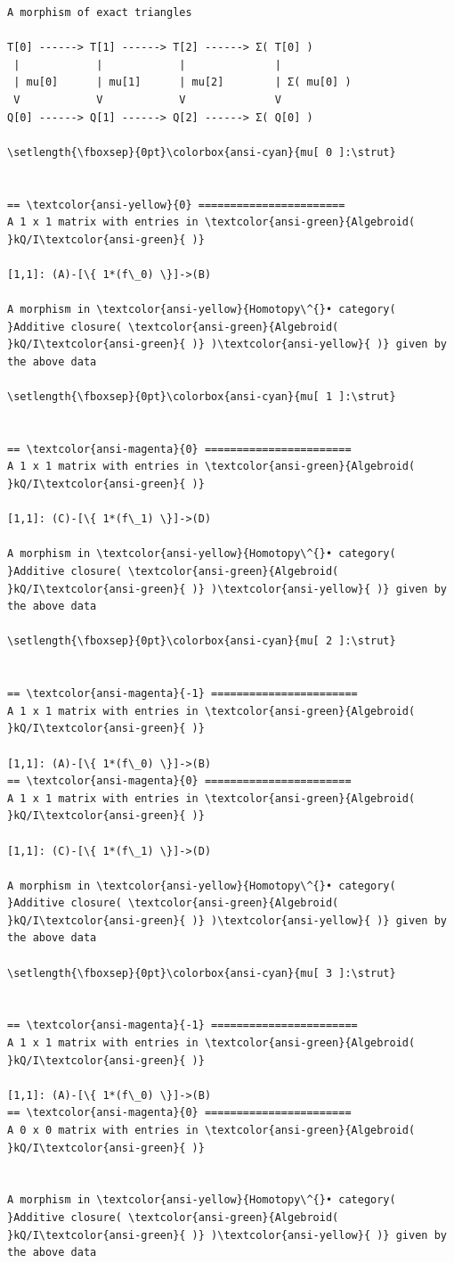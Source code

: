 \documentclass[11pt]{article}
\begin{document}
    \begin{Verbatim}[commandchars=\\\{\}]
A morphism of exact triangles

T[0] ------> T[1] ------> T[2] ------> Σ( T[0] )
 |            |            |              |
 | mu[0]      | mu[1]      | mu[2]        | Σ( mu[0] )
 V            V            V              V
Q[0] ------> Q[1] ------> Q[2] ------> Σ( Q[0] )

\setlength{\fboxsep}{0pt}\colorbox{ansi-cyan}{mu[ 0 ]:\strut}


== \textcolor{ansi-yellow}{0} =======================
A 1 x 1 matrix with entries in \textcolor{ansi-green}{Algebroid( }kQ/I\textcolor{ansi-green}{ )}

[1,1]: (A)-[\{ 1*(f\_0) \}]->(B)

A morphism in \textcolor{ansi-yellow}{Homotopy\^{}• category( }Additive closure( \textcolor{ansi-green}{Algebroid(
}kQ/I\textcolor{ansi-green}{ )} )\textcolor{ansi-yellow}{ )} given by the above data

\setlength{\fboxsep}{0pt}\colorbox{ansi-cyan}{mu[ 1 ]:\strut}


== \textcolor{ansi-magenta}{0} =======================
A 1 x 1 matrix with entries in \textcolor{ansi-green}{Algebroid( }kQ/I\textcolor{ansi-green}{ )}

[1,1]: (C)-[\{ 1*(f\_1) \}]->(D)

A morphism in \textcolor{ansi-yellow}{Homotopy\^{}• category( }Additive closure( \textcolor{ansi-green}{Algebroid(
}kQ/I\textcolor{ansi-green}{ )} )\textcolor{ansi-yellow}{ )} given by the above data

\setlength{\fboxsep}{0pt}\colorbox{ansi-cyan}{mu[ 2 ]:\strut}


== \textcolor{ansi-magenta}{-1} =======================
A 1 x 1 matrix with entries in \textcolor{ansi-green}{Algebroid( }kQ/I\textcolor{ansi-green}{ )}

[1,1]: (A)-[\{ 1*(f\_0) \}]->(B)
== \textcolor{ansi-magenta}{0} =======================
A 1 x 1 matrix with entries in \textcolor{ansi-green}{Algebroid( }kQ/I\textcolor{ansi-green}{ )}

[1,1]: (C)-[\{ 1*(f\_1) \}]->(D)

A morphism in \textcolor{ansi-yellow}{Homotopy\^{}• category( }Additive closure( \textcolor{ansi-green}{Algebroid(
}kQ/I\textcolor{ansi-green}{ )} )\textcolor{ansi-yellow}{ )} given by the above data

\setlength{\fboxsep}{0pt}\colorbox{ansi-cyan}{mu[ 3 ]:\strut}


== \textcolor{ansi-magenta}{-1} =======================
A 1 x 1 matrix with entries in \textcolor{ansi-green}{Algebroid( }kQ/I\textcolor{ansi-green}{ )}

[1,1]: (A)-[\{ 1*(f\_0) \}]->(B)
== \textcolor{ansi-magenta}{0} =======================
A 0 x 0 matrix with entries in \textcolor{ansi-green}{Algebroid( }kQ/I\textcolor{ansi-green}{ )}


A morphism in \textcolor{ansi-yellow}{Homotopy\^{}• category( }Additive closure( \textcolor{ansi-green}{Algebroid(
}kQ/I\textcolor{ansi-green}{ )} )\textcolor{ansi-yellow}{ )} given by the above data
    \end{Verbatim}
\end{document}
